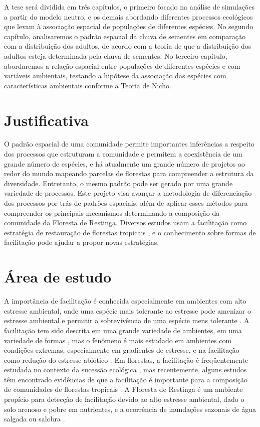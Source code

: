 \documentclass[twoside,12pt,a4paper]{report}
\begin{document}
A tese será dividida em três capítulos, o primeiro focado na análise de simulações a partir
do modelo neutro, e os demais abordando diferentes processos ecológicos que levam à
associação espacial de populações de diferentes espécies. No segundo capítulo, analisaremos o
padrão espacial da chuva de sementes em comparação com a distribuição dos adultos, de acordo com a
teoria de que a distribuição dos adultos esteja determinada pela chuva de sementes. No
terceiro
capítulo, abordaremos a relação espacial entre populações de diferentes espécies e com variáveis
ambientais, testando a hipótese da associação das espécies com características ambientais conforme a
Teoria de Nicho.


\section{Justificativa}

O padrão espacial de uma comunidade permite importantes inferências a respeito dos processos que
estruturam a comunidade e permitem a coexistência de um grande número de espécies, e há atualmente
um grande número de projetos ao redor do mundo mapeando parcelas de florestas para compreender a
estrutura da diversidade. Entretanto, o mesmo padrão pode ser gerado por uma grande variedade de
processos. Este projeto visa avançar a metodologia de diferenciação dos processos por trás de
padrões espaciais, além de aplicar esses métodos para compreender os principais mecanismos
determinando a composição da comunidade da Floresta de Restinga. Diversos estudos usam a facilitação
como estratégia de restauração de florestas tropicais \citep{Zwiener2014,ref}, e o
conhecimento sobre formas de facilitação pode ajudar a propor novas estratégias.

\section{Área de estudo}
A importância de facilitação é conhecida especialmente em ambientes com alto estresse
ambiental, onde uma espécie mais tolerante ao estresse pode amenizar o estresse ambiental e
permitir a sobrevivência de uma espécie mens tolerante \citep{BertnessHacker1994,
BertnessCallaway1995}. 
A facilitação tem sido descrita em uma grande variedade de ambientes, em
uma variedade de formas \citep{McIntire2014}, mas o fenômeno é mais estudado em ambientes com
condições extremas, especialmente em gradientes de estresse, e na facilitação como redução do
estresse abiótico \citep{Brooker2008}. Em florestas, a facilitação é freqüentemente
estudada no contexto da sucessão ecológica \citep{refs refs refs}, mas recentemente, alguns
estudos têm encontrado evidências de que a facilitação é importante para a composição de
comunidades de florestas tropicais
\citep{Ledo2015,refs}. A Floresta de Restinga é um ambiente propício para detecção de facilitação devido ao alto estresse
ambiental, dado o solo arenoso e pobre em nutrientes, e a ocorrência de inundações sazonais de água
salgada ou salobra \citep{TODO refs}. 
\end{document}

